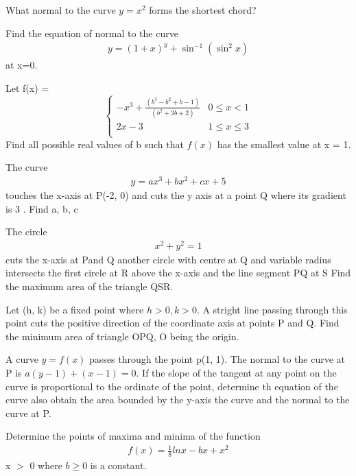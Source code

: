 \item What normal to the curve $y = x^2$ forms the shortest chord?

\item Find the equation of normal to the curve 
\begin{align*}
y = (1 + x)^y + \sin^{-1}(\sin^2 x)
\end{align*} 
at x=0. 

\item Let 
f(x) = 
\[ \begin{cases} 
      -x^3 + \frac{(b^3 - b^2 + b - 1)}{(b^2 + 3b + 2)} &  0 \leq x < 1\\
      2x - 3 & 1 \leq x \leq 3\\
      \end{cases}
\]
Find all possible real values of b such that $f(x)$ has the smallest value at x = 1.

\item The curve 
\begin{align}
y = ax^3 + bx^2 + cx + 5
\end{align} 
touches the x-axis at P(-2, 0) and cuts the y axis at a point Q where its gradient is 3 . Find a, b, c

\item The circle 
\begin{align}
x^2 + y^2 = 1
\end{align} 
cuts the x-axis at Pand Q another circle with centre at Q and variable radius intersects the first circle at R above the x-axis and the line segment PQ at S Find the maximum area of the triangle QSR.

\item Let (h, k) be a fixed point where $h > 0, k > 0$. A stright line passing through this point cuts the positive direction of the coordinate axis at points P and Q. Find the minimum area of triangle OPQ, O being the origin.

\item A curve $y = f(x)$ passes through the point p(1, 1). The normal to the curve at P is $a(y - 1) + (x - 1) = 0$. If the slope of the tangent at any point on the curve is proportional to the ordinate of the point, determine th equation of the curve also obtain the area bounded by the y-axis the curve and the normal to the curve at P.

\item Determine the points of maxima and minima of the function 
\begin{align*} 
f(x) = \frac{1}{8} ln x - bx + x^2
\end{align*}
x $>$ 0 where $b \geq 0$ is a constant.


